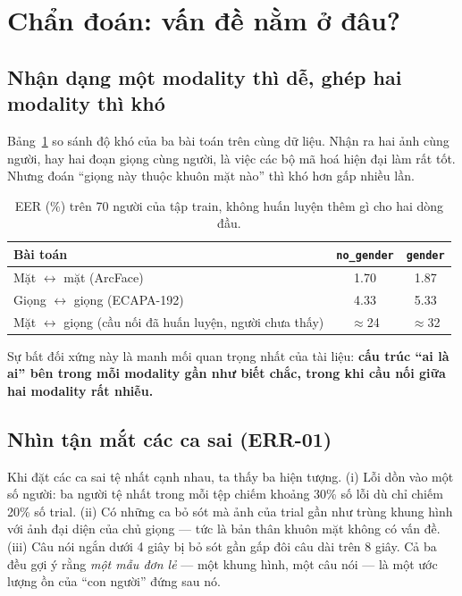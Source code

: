 \documentclass[11pt,a4paper]{article}
\newcommand{\key}[1]{\textbf{\color{accent}#1}}
\begin{document}
\section{Chẩn đoán: vấn đề nằm ở đâu?}

\subsection{Nhận dạng một modality thì dễ, ghép hai modality thì khó}

Bảng~\ref{tab:uni} so sánh độ khó của ba bài toán trên cùng dữ liệu. Nhận ra hai ảnh cùng người, hay hai đoạn giọng cùng người, là việc các bộ mã hoá hiện đại làm rất tốt. Nhưng đoán ``giọng này thuộc khuôn mặt nào'' thì khó hơn gấp nhiều lần.

\begin{table}[h]
\centering
\caption{EER (\%) trên 70 người của tập train, không huấn luyện thêm gì cho hai dòng đầu.}
\label{tab:uni}
\begin{tabular}{lcc}
\toprule
Bài toán & \texttt{no\_gender} & \texttt{gender} \\
\midrule
Mặt $\leftrightarrow$ mặt (ArcFace) & 1.70 & 1.87 \\
Giọng $\leftrightarrow$ giọng (ECAPA-192) & 4.33 & 5.33 \\
Mặt $\leftrightarrow$ giọng (cầu nối đã huấn luyện, người chưa thấy) & $\approx$24 & $\approx$32 \\
\bottomrule
\end{tabular}
\end{table}

Sự bất đối xứng này là manh mối quan trọng nhất của tài liệu: \key{cấu trúc ``ai là ai'' bên trong mỗi modality gần như biết chắc, trong khi cầu nối giữa hai modality rất nhiễu.}

\subsection{Nhìn tận mắt các ca sai (ERR-01)}

Khi đặt các ca sai tệ nhất cạnh nhau, ta thấy ba hiện tượng. (i) Lỗi dồn vào một số người: ba người tệ nhất trong mỗi tệp chiếm khoảng 30\% số lỗi dù chỉ chiếm 20\% số trial. (ii) Có những ca bỏ sót mà ảnh của trial gần như trùng khung hình với ảnh đại diện của chủ giọng --- tức là bản thân khuôn mặt không có vấn đề. (iii) Câu nói ngắn dưới 4 giây bị bỏ sót gần gấp đôi câu dài trên 8 giây. Cả ba đều gợi ý rằng \emph{một mẫu đơn lẻ} --- một khung hình, một câu nói --- là một ước lượng ồn của ``con người'' đứng sau nó.
\end{document}
